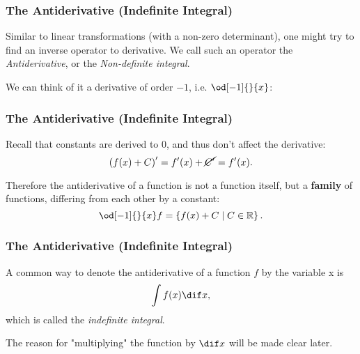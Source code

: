 \begin{frame}
	\frametitle{The Antiderivative (Indefinite Integral)}
	Similar to linear transformations (with a non-zero determinant), one might try to find an inverse operator to derivative. We call such an operator the \emph{Antiderivative}, or the \emph{Non-definite integral}.

	We can think of it a derivative of order $-1$, i.e. $\od[-1]{}{x}$:

	\vspace{5mm}
	\centering
\end{frame}

\begin{frame}
	\frametitle{The Antiderivative (Indefinite Integral)}
	Recall that constants are derived to $0$, and thus don't affect the derivative:
	\begin{equation*}
		\left( f(x) + C \right)' = f'(x) + \cancel{C'} = f'(x).
	\end{equation*}

	Therefore the antiderivative of a function is not a function itself, but a \textbf{family} of functions, differing from each other by a constant:
	\begin{equation*}
		\od[-1]{}{x}f = \left\{ f(x)+C \mid C\in\mathbb{R} \right\}.
	\end{equation*}
\end{frame}

\begin{frame}
	\frametitle{The Antiderivative (Indefinite Integral)}
	A common way to denote the antiderivative of a function $f$ by the variable x is
	\begin{equation*}
		\int f(x) \dif x,
	\end{equation*}
	which is called the \emph{indefinite integral}.

	The reason for "multiplying" the function by $\dif x$ will be made clear later.
\end{frame}

